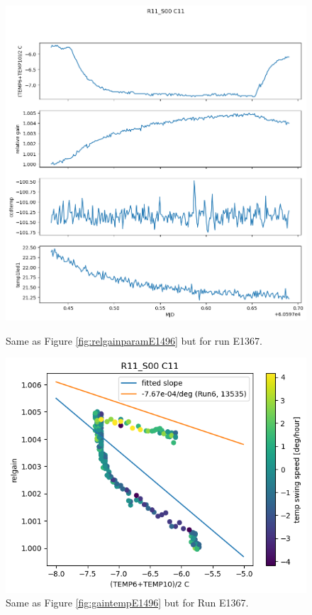 \begin{figure}[htbp]
\centering
\begin{minipage}{0.45\textwidth}
    \centering
    \includegraphics[width=\textwidth]{figures/gaintemp/E1367RelgainParametersTrending.png}
    \caption{Same as Figure \ref{fig:relgainparamE1496} but for run E1367.}
    \label{fig:relgainparamE1367}
\end{minipage}
\hfill
\begin{minipage}{0.45\textwidth}
    \centering
    \includegraphics[width=\textwidth]{figures/gaintemp/E1367RelgainDetail.png}
    \caption{Same as Figure \ref{fig:gaintempE1496} but for Run E1367.}
    \label{fig:gaintempE1367}
\end{minipage}
\end{figure}

